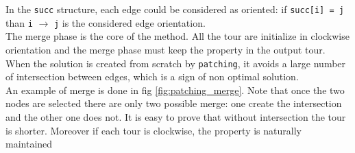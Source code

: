 In the \texttt{succ} structure, each edge could be considered as oriented: if \texttt{succ[i] = j} than \texttt{i} $\rightarrow$ \texttt{j} is the considered edge orientation. \\
The merge phase is the core of the method. All the tour are initialize in clockwise orientation and the merge phase must keep the property in the output tour. When the solution is created from scratch by \texttt{patching}, it avoids a large number of intersection between edges, which is a sign of non optimal solution. \\
An example of merge is done in fig \ref{fig:patching_merge}. Note that once the two nodes are selected there are only two possible merge: one create the intersection and the other one does not. It is easy to prove that without intersection the tour is shorter. Moreover if each tour is clockwise, the property is naturally maintained
